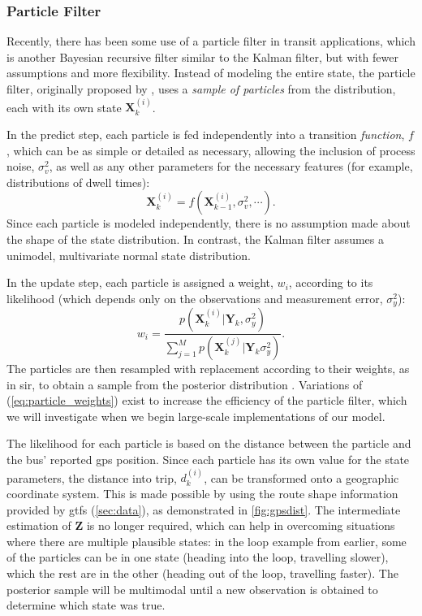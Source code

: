 \documentclass[12pt,a4paper]{article}
\newcommand{\bY}{\mathbf{Y}}
\newcommand{\bX}{\mathbf{X}}
\newcommand{\mat}[1]{\mathbf{#1}}
\newcommand{\kf}{Kalman filter}
\newcommand{\pf}{particle filter}
\begin{document}
\subsubsection{Particle Filter}
\label{sec:particle-filter}

Recently, there has been some use of a \pf{} in transit applications,
which is another Bayesian recursive filter similar to the \kf{},
but with fewer assumptions and more flexibility.
Instead of modeling the entire state,
the \pf{}, originally proposed by \cite{gordon-etal:1993},
uses a \emph{sample of particles} from the distribution,
each with its own state $\bX_k^{(i)}$.


In the predict step,
each particle is fed independently into a transition \emph{function}, $f$,
which can be as simple or detailed as necessary,
allowing the inclusion of process noise, $\sigma_v^2$,
as well as any other parameters for the necessary features (for example,
distributions of dwell times):
\begin{equation}
  \label{eq:particle_transition}
  \bX_k^{(i)} = f(\bX_{k-1}^{(i)}, \sigma_v^2, \cdots).
\end{equation}
Since each particle is modeled independently,
there is no assumption made about the shape of the state distribution.
In contrast, the \kf{} assumes a unimodel, multivariate normal state distribution.


In the update step, each particle is assigned a weight, $w_i$, according to its likelihood
(which depends only on the observations and measurement error, $\sigma_y^2$):
\begin{equation}
  \label{eq:particle_weights}
  w_i = \frac{p(\bX_k^{(i)} | \bY_k, \sigma_y^2)}{\sum_{j=1}^M p(\bX_k^{(j)} | \bY_k \sigma_y^2)}.
\end{equation}
The particles are then resampled with replacement according to their weights,
as in \gls{sir},
to obtain a sample from the posterior distribution \citep{gordon-etal:1993}.
Variations of (\ref{eq:particle_weights}) exist to increase the efficiency of the \pf{},
which we will investigate when we begin large-scale implementations of our model.


The likelihood for each particle is based on the distance between the particle
and the bus' reported \gls{gps} position.
Since each particle has its own value for the state parameters,
the distance into trip, $d_k^{(i)}$, can be transformed onto a geographic coordinate system.
This is made possible by using the route shape information provided by \gls{gtfs} (\cref{sec:data}),
as demonstrated in \cref{fig:gpsdist}.
The intermediate estimation of $\mat{Z}$ is no longer required,
which can help in overcoming situations where there are multiple plausible states:
in the loop example from earlier, some of the particles can be in one state
(heading into the loop, travelling slower), 
which the rest are in the other (heading out of the loop, travelling faster).
The posterior sample will be multimodal until a new observation is obtained to 
determine which state was true.
\end{document}

